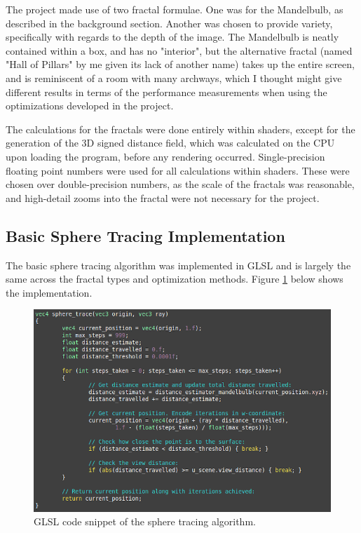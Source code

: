 The project made use of two fractal formulae. One was for the Mandelbulb, as described in the background section. Another was chosen to provide variety, specifically with regards to the depth of the image. The Mandelbulb is neatly contained within a box, and has no "interior", but the alternative fractal (named "Hall of Pillars" by me given its lack of another name) takes up the entire screen, and is reminiscent of a room with many archways, which I thought might give different results in terms of the performance measurements when using the optimizations developed in the project.\newline

The calculations for the fractals were done entirely within shaders, except for the generation of the 3D signed distance field, which was calculated on the CPU upon loading the program, before any rendering occurred. Single-precision floating point numbers were used for all calculations within shaders. These were chosen over double-precision numbers, as the scale of the fractals was reasonable, and high-detail zooms into the fractal were not necessary for the project.

\subsection{Basic Sphere Tracing Implementation}

The basic sphere tracing algorithm was implemented in GLSL and is largely the same across the fractal types and optimization methods. Figure \ref{figure:glsl-sphere-tracing} below shows the implementation.

\begin{figure}[ht]
	\centering
	\includegraphics[width=0.65\linewidth, frame]{Images/GLSL-Sphere-Tracing.png}
	\caption{GLSL code snippet of the sphere tracing algorithm.}
	\label{figure:glsl-sphere-tracing}
\end{figure}

